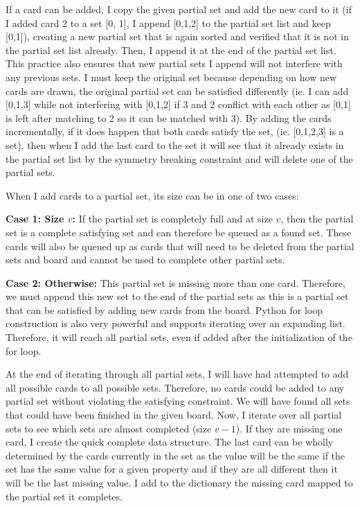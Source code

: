 \documentclass[pageno]{jpaper}
\begin{document}
If a card can be added, I copy the given partial set and add the new card to it (if I added card 2 to a set [0, 1], I append [0,1,2] to the partial set list and keep [0,1]), creating a  new partial set that is again sorted and verified that it is not in the partial set list already. Then, I append it at the end of the partial set list. This practice also ensures that new partial sets I append will not interfere with any previous sets. I must keep the original set because depending on how new cards are drawn, the original partial set can be satisfied differently (ie. I can add [0,1,3] while not interfering with [0,1,2] if 3 and 2 conflict with each other as [0,1] is left after matching to 2 so it can be matched with 3). By adding the cards incrementally, if it does happen that both cards satisfy the set, (ie. [0,1,2,3] is a set), then when I add the last card to the set it will see that it already exists in the partial set list by the symmetry breaking constraint and will delete one of the partial sets.

When I add cards to a partial set, its size can be in one of two cases:

\textbf{Case 1: Size $v$:} If the partial set is completely full and at size $v$, then the partial set is a complete satisfying set and can therefore be queued as a found set. These cards will also be queued up as cards that will need to be deleted from the partial sets and board and cannot be used to complete other partial sets.

\textbf{Case 2: Otherwise:} This partial set is missing more than one card. Therefore, we must append this new set to the end of the partial sets as this is a partial set that can be satisfied by adding new cards from the board. Python for loop construction is also very powerful and supports iterating over an expanding list. Therefore, it will reach all partial sets, even if added after the initialization of the for loop. 

At the end of iterating through all partial sets, I will have had attempted to add all possible cards to all possible sets. Therefore, no cards could be added to any partial set without violating the satisfying constraint. We will have found all sets that could have been finished in the given board. Now, I iterate over all partial sets to see which sets are almost completed (size $v-1$). If they are missing one card, I create the quick complete data structure. The last card can be wholly determined by the cards currently in the set as the value will be the same if the set has the same value for a given property and if they are all different then it will be the last missing value. I add to the dictionary the missing card mapped to the partial set it completes.
\end{document}
